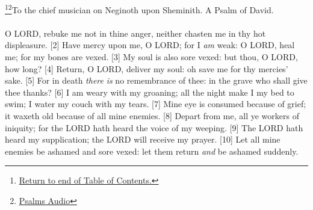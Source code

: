 
\footnote{\textcolor[cmyk]{0.99998,1,0,0}{\hyperlink{TOC}{Return to end of Table of Contents.}}}\footnote{\href{https://audiobible.com/bible/bible.html}{\textcolor[cmyk]{0.99998,1,0,0}{Psalms Audio}}}\textcolor[cmyk]{0.99998,1,0,0}{To the chief musician on Neginoth upon Sheminith. A Psalm of David.}\\
\\
\textcolor[cmyk]{0.99998,1,0,0}{O LORD, rebuke me not in thine anger, neither chasten me in thy hot displeasure.}
[2] \textcolor[cmyk]{0.99998,1,0,0}{Have mercy upon me, O LORD; for I \emph{am} weak: O LORD, heal me; for my bones are vexed.}
[3] \textcolor[cmyk]{0.99998,1,0,0}{My soul is also sore vexed: but thou, O LORD, how long?}
[4] \textcolor[cmyk]{0.99998,1,0,0}{Return, O LORD, deliver my soul: oh save me for thy mercies' sake.}
[5] \textcolor[cmyk]{0.99998,1,0,0}{For in death \emph{there} \emph{is} no remembrance of thee: in the grave who shall give thee thanks?}
[6] \textcolor[cmyk]{0.99998,1,0,0}{I am weary with my groaning; all the night make I my bed to swim; I water my couch with my tears.}
[7] \textcolor[cmyk]{0.99998,1,0,0}{Mine eye is consumed because of grief; it waxeth old because of all mine enemies.}
[8] \textcolor[cmyk]{0.99998,1,0,0}{Depart from me, all ye workers of iniquity; for the LORD hath heard the voice of my weeping.}
[9] \textcolor[cmyk]{0.99998,1,0,0}{The LORD hath heard my supplication; the LORD will receive my prayer.}
[10] \textcolor[cmyk]{0.99998,1,0,0}{Let all mine enemies be ashamed and sore vexed: let them return \emph{and} be ashamed suddenly.}



